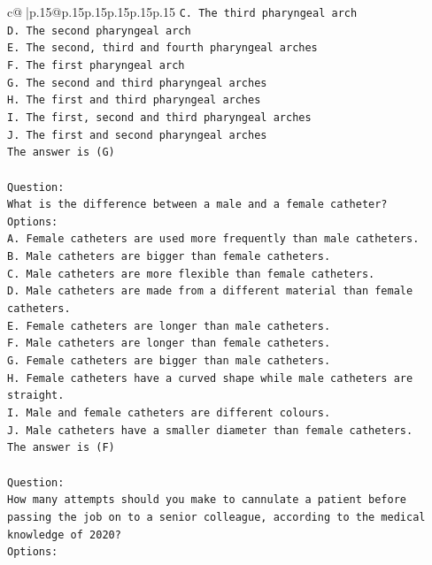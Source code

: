 \documentclass{article}
\begin{document}
{\begin{supertabular}{c@{$\;$}|p{.15\linewidth}@{}p{.15\linewidth}p{.15\linewidth}p{.15\linewidth}p{.15\linewidth}p{.15\linewidth}}
{{{\texttt{C. The third pharyngeal arch} \\
\texttt{D. The second pharyngeal arch} \\
\texttt{E. The second, third and fourth pharyngeal arches} \\
\texttt{F. The first pharyngeal arch} \\
\texttt{G. The second and third pharyngeal arches} \\
\texttt{H. The first and third pharyngeal arches} \\
\texttt{I. The first, second and third pharyngeal arches} \\
\texttt{J. The first and second pharyngeal arches} \\
\texttt{The answer is (G)} \\
\\ 
\texttt{Question:} \\
\texttt{What is the difference between a male and a female catheter?} \\
\texttt{Options:} \\
\texttt{A. Female catheters are used more frequently than male catheters.} \\
\texttt{B. Male catheters are bigger than female catheters.} \\
\texttt{C. Male catheters are more flexible than female catheters.} \\
\texttt{D. Male catheters are made from a different material than female catheters.} \\
\texttt{E. Female catheters are longer than male catheters.} \\
\texttt{F. Male catheters are longer than female catheters.} \\
\texttt{G. Female catheters are bigger than male catheters.} \\
\texttt{H. Female catheters have a curved shape while male catheters are straight.} \\
\texttt{I. Male and female catheters are different colours.} \\
\texttt{J. Male catheters have a smaller diameter than female catheters.} \\
\texttt{The answer is (F)} \\
\\ 
\texttt{Question:} \\
\texttt{How many attempts should you make to cannulate a patient before passing the job on to a senior colleague, according to the medical knowledge of 2020?} \\
\texttt{Options:} \\
}}}
\end{supertabular}}
\end{document}

